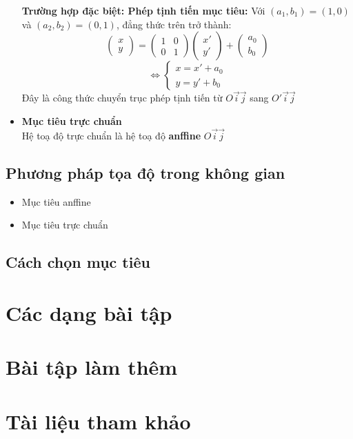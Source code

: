 \documentclass[12pt,a4]{article}
\begin{document}
\begin{titlepage}
\begin{itemize}
\[    \]
    \textbf{Trường hợp đặc biệt: Phép tịnh tiến mục tiêu:}
    Với $(a_1, b_1) = (1,0)$ và $(a_2, b_2) = (0,1)$, đẳng thức trên trở thành:  
    \[
        \begin{pmatrix}
            x\\
            y
        \end{pmatrix}
        =
        \begin{pmatrix}
            1& 0\\
            0 & 1
        \end{pmatrix}
        \begin{pmatrix}
            x'\\
            y'
        \end{pmatrix}
        +
        \begin{pmatrix}
        a_0\\
        b_0
        \end{pmatrix}
    \]
    \[
    \Leftrightarrow \begin{cases}
            x = x' + a_0\\
            y = y' + b_0
        \end{cases}
    \]
    Đây là công thức chuyển trục phép tịnh tiến từ $O\vec{i}\vec{j}$ sang $O'\vec{i}\vec{j}$
    \item \textbf{Mục tiêu trực chuẩn}\\
    Hệ toạ độ trực chuẩn là hệ toạ độ \textbf{anffine} $O\vec{i}\vec{j}$
\end{itemize}
\subsection{Phương pháp tọa độ trong không gian}
\begin{itemize}
    \item Mục tiêu anffine\\
    \item Mục tiêu trực chuẩn\\
\end{itemize}
\subsection{Cách chọn mục tiêu}
\section{Các dạng bài tập}
\section{Bài tập làm thêm}
\section{Tài liệu tham khảo}
\end{titlepage}
\end{document}

